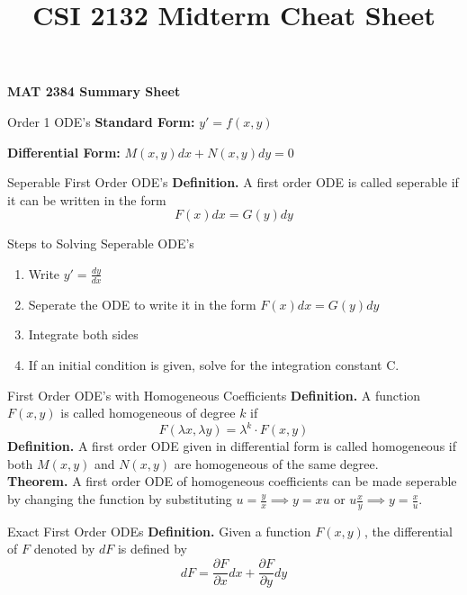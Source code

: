 \documentclass{article}
\title{CSI 2132 Midterm Cheat Sheet}
\begin{document}
\begin{center}{\large{\textbf{MAT 2384 Summary Sheet}}}\\
\end{center}




\begin{multicols*}{3}
\begin{blackbox}{Order 1 ODE's}
    \textbf{Standard Form:} $y' = f(x,y)$

    \textbf{Differential Form:} $M(x,y)dx + N(x,y)dy = 0$
    \begin{bluebox}{Seperable First Order ODE's}
        \textbf{Definition.} A first order ODE is called seperable if it can be written in the form \\[-2ex]
        \[F(x)dx = G(y)dy\]
        \begin{redbox}{Steps to Solving Seperable ODE's}
            \begin{enumerate}
                \item Write $y' = \frac{dy}{dx}$
                \item Seperate the ODE to write it in the form $F(x)dx = G(y)dy$
                \item Integrate both sides
                \item If an initial condition is given, solve for the integration constant C. 
            \end{enumerate}
        \end{redbox}
    \end{bluebox}
    \begin{brownbox}{First Order ODE's with Homogeneous Coefficients}
        \textbf{Definition.} A function $F(x,y)$ is called homogeneous of degree $k$ if \\[-2ex]
        \[F(\lambda x, \lambda y) = \lambda^k \cdot F(x,y)\]
        \textbf{Definition.} A first order ODE given in differential form is called homogeneous if both $M(x,y)$ and $N(x,y)$ are homogeneous of the same degree.\\[1ex]
        \textbf{Theorem.} A first order ODE of homogeneous coefficients can be made seperable by changing the function by substituting $u = \frac{y}{x} \implies y = xu$ or $u \frac{x}{y} \implies y = \frac{x}{u}$. 
    \end{brownbox}
    \begin{bluebox}{Exact First Order ODEs}
        \textbf{Definition.} Given a function $F(x,y)$, the differential of $F$ denoted by $dF$ is defined by
        \[dF = \frac{\partial F}{\partial x} dx + \frac{\partial F}{\partial y}dy\]

\end{bluebox}
\end{blackbox}
\end{multicols*}
\end{document}
